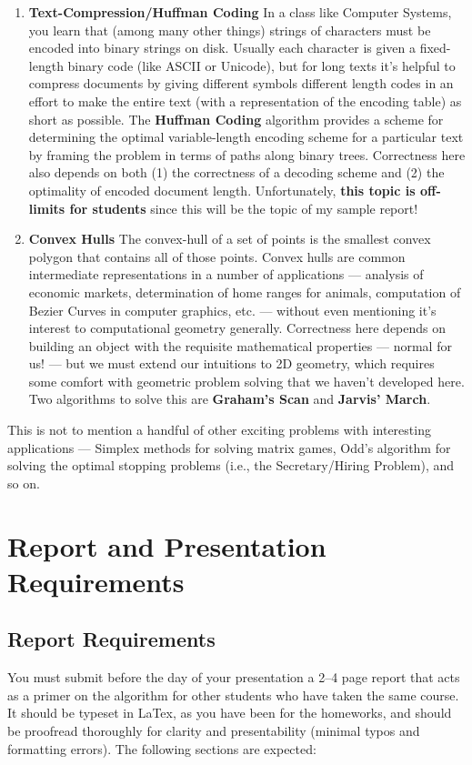 \documentclass{article}
\begin{document}
\begin{enumerate}
    \item \textbf{Text-Compression/Huffman Coding} In a class like Computer Systems, you learn that (among many other things) strings of characters must be encoded into binary strings on disk. Usually each character is given a fixed-length binary code (like ASCII or Unicode), but for long texts it's helpful to compress documents by giving different symbols different length codes in an effort to make the entire text (with a representation of the encoding table) as short as possible. The \textbf{Huffman Coding} algorithm provides a scheme for determining the optimal variable-length encoding scheme for a particular text by framing the problem in terms of paths along binary trees. Correctness here also depends on both (1) the correctness of a decoding scheme and (2) the optimality of encoded document length. Unfortunately, \textbf{this topic is off-limits for students} since this will be the topic of my sample report!

    \item \textbf{Convex Hulls} The convex-hull of a set of points is the smallest convex polygon that contains all of those points. Convex hulls are common intermediate representations in a number of applications --- analysis of economic markets, determination of home ranges for animals, computation of Bezier Curves in computer graphics, etc. --- without even mentioning it's interest to computational geometry generally. Correctness here depends on building an object with the requisite mathematical properties --- normal for us! --- but we must extend our intuitions to 2D geometry, which requires some comfort with geometric problem solving that we haven't developed here. Two algorithms to solve this are \textbf{Graham's Scan} and \textbf{Jarvis' March}. 
\end{enumerate}

This is not to mention a handful of other exciting problems with interesting applications --- Simplex methods for solving matrix games, Odd's algorithm for solving the optimal stopping problems (i.e., the Secretary/Hiring Problem), and so on. 

\section{Report and Presentation Requirements}

\subsection{Report Requirements}
You must submit before the day of your presentation a 2--4 page report that acts as a primer on the algorithm for other students who have taken the same course. It should be typeset in LaTex, as you have been for the homeworks, and should be proofread thoroughly for clarity and presentability (minimal typos and formatting errors). The following sections are expected:
\end{document}
